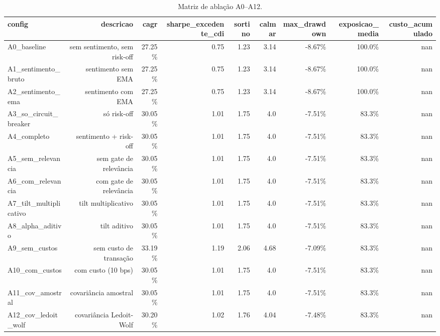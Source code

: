 \begin{table}[htbp]
\centering
\caption{Matriz de ablação A0–A12.}
\label{tab:ablacoes}
\begin{tabular}{lrrrrrrrr}
\toprule
config & descricao & cagr & sharpe\_excedente\_cdi & sortino & calmar & max\_drawdown & exposicao\_media & custo\_acumulado \\
\midrule
A0\_baseline & sem sentimento, sem risk-off & 27.25\% & 0.75 & 1.23 & 3.14 & -8.67\% & 100.0\% & nan \\
A1\_sentimento\_bruto & sentimento sem EMA & 27.25\% & 0.75 & 1.23 & 3.14 & -8.67\% & 100.0\% & nan \\
A2\_sentimento\_ema & sentimento com EMA & 27.25\% & 0.75 & 1.23 & 3.14 & -8.67\% & 100.0\% & nan \\
A3\_so\_circuit\_breaker & só risk-off & 30.05\% & 1.01 & 1.75 & 4.0 & -7.51\% & 83.3\% & nan \\
A4\_completo & sentimento + risk-off & 30.05\% & 1.01 & 1.75 & 4.0 & -7.51\% & 83.3\% & nan \\
A5\_sem\_relevancia & sem gate de relevância & 30.05\% & 1.01 & 1.75 & 4.0 & -7.51\% & 83.3\% & nan \\
A6\_com\_relevancia & com gate de relevância & 30.05\% & 1.01 & 1.75 & 4.0 & -7.51\% & 83.3\% & nan \\
A7\_tilt\_multiplicativo & tilt multiplicativo & 30.05\% & 1.01 & 1.75 & 4.0 & -7.51\% & 83.3\% & nan \\
A8\_alpha\_aditivo & tilt aditivo & 30.05\% & 1.01 & 1.75 & 4.0 & -7.51\% & 83.3\% & nan \\
A9\_sem\_custos & sem custo de transação & 33.19\% & 1.19 & 2.06 & 4.68 & -7.09\% & 83.3\% & nan \\
A10\_com\_custos & com custo (10 bps) & 30.05\% & 1.01 & 1.75 & 4.0 & -7.51\% & 83.3\% & nan \\
A11\_cov\_amostral & covariância amostral & 30.05\% & 1.01 & 1.75 & 4.0 & -7.51\% & 83.3\% & nan \\
A12\_cov\_ledoit\_wolf & covariância Ledoit-Wolf & 30.20\% & 1.02 & 1.76 & 4.04 & -7.48\% & 83.3\% & nan \\
\bottomrule
\end{tabular}
\end{table}
